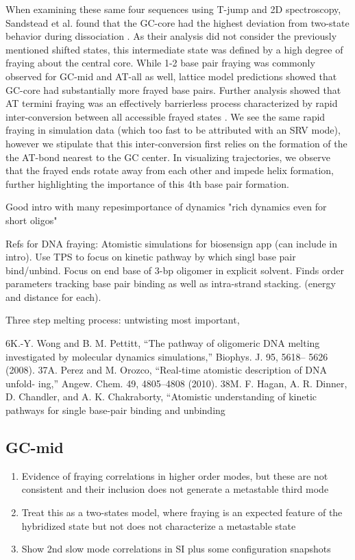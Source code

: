 \documentclass[journal=jpcbfk,manuscript=article]{achemso}
\begin{document}
When examining these same four sequences using T-jump and 2D spectroscopy, Sandstead et al. found that the GC-core had the highest deviation from two-state behavior during dissociation \citep{Sanstead2016}. As their analysis did not consider the previously mentioned shifted states, this intermediate state was defined by a high degree of fraying about the central core. While 1-2 base pair fraying was commonly observed for GC-mid and AT-all as well, lattice model predictions showed that GC-core had substantially more frayed base pairs. Further analysis showed that AT termini fraying was an effectively barrierless process characterized by rapid inter-conversion between all accessible frayed states \citep{Sanstead2018DirectDehybridization}. We see the same rapid fraying in simulation data (which too fast to be attributed with an SRV mode), however we stipulate that this inter-conversion first relies on the formation of the the AT-bond nearest to the GC center. In visualizing trajectories, we observe that the frayed ends rotate away from each other and impede helix formation, further highlighting the importance of this 4th base pair formation.


\citep{Sanstead2018DirectDehybridization} Good intro with many repesimportance of dynamics "rich dynamics even for short oligos"


Refs for DNA fraying:
\citep{Hagan2003AtomisticDNA} Atomistic simulations for biosensign app (can include in intro). Use TPS to focus on kinetic pathway by which singl base pair bind/unbind. Focus on end base of 3-bp oligomer in explicit solvent. Finds order parameters tracking base pair binding as well as intra-strand stacking. (energy and distance for each). 

\citep{Wong2008TheSimulations} Three step melting process: untwisting most important,

6K.-Y. Wong and B. M. Pettitt, “The pathway of oligomeric DNA melting investigated by molecular dynamics simulations,” Biophys. J. 95, 5618– 5626 (2008).
37A. Perez and M. Orozco, “Real-time atomistic description of DNA unfold- ing,” Angew. Chem. 49, 4805–4808 (2010).
38M. F. Hagan, A. R. Dinner, D. Chandler, and A. K. Chakraborty, “Atomistic understanding of kinetic pathways for single base-pair binding and unbinding

\subsection{\label{sec:Results}GC-mid}
\begin{enumerate}
	\item Evidence of fraying correlations in higher order modes, but these are not consistent and their inclusion does not generate a metastable third mode
	\item Treat this as a two-states model, where fraying is an expected feature of the hybridized state but not does not characterize a metastable state
	\item Show 2nd slow mode correlations in SI plus some configuration snapshots
	
\end{enumerate}  
\end{document}
